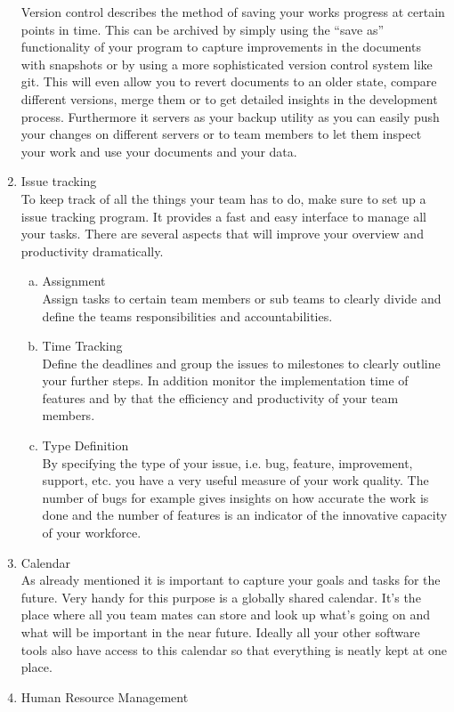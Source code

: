 \begin{multicols}{2}
\begin{enumerate}[1.]
Version control describes the method of saving your works progress at certain points in time. This can be archived by simply using the “save as” functionality of your program to capture improvements in the documents with snapshots or by using a more sophisticated version control system like git.
This will even allow you to revert documents to an older state, compare different versions, merge them or to get detailed insights in the development process. Furthermore it servers as your backup utility as you can easily push your changes on different servers or to team members to let them inspect your work and use your documents and your data.
	\item Issue tracking\\
To keep track of all the things your team has to do, make sure to set up a issue tracking program. It provides a fast and easy interface to manage all your tasks. There are several aspects that will improve your overview and productivity dramatically.
		\begin{enumerate}[a)]
		  \item Assignment\\
Assign tasks to certain team members or sub teams to clearly divide and define the teams responsibilities and accountabilities. 
		  \item Time Tracking\\
Define the deadlines and group the issues to milestones to clearly outline your further steps. In addition monitor the implementation time of features and by that the efficiency and productivity of your team members.
		  \item Type Definition\\
By specifying the type of your issue, i.e. bug, feature, improvement, support, etc. you have a very useful measure of your work quality. The number of bugs for example gives insights on how accurate the work is done and the number of features is an indicator of the innovative capacity of your workforce.
		\end{enumerate}
	\item Calendar\\
As already mentioned it is important to capture your goals and tasks for the future. Very handy for this purpose is a globally shared calendar. It’s the place where all you team mates can store and look up what’s going on and what will be important in the near future. Ideally all your other software tools also have access to this calendar so that everything is neatly kept at one place.
	\item Human Resource Management\\

\end{enumerate}
\end{multicols}
